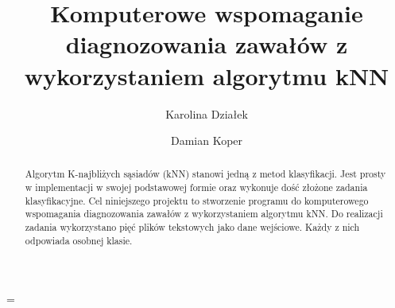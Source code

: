 \documentclass[runningheads]{llncs2e/llncs}
\begin{document}
\setlength{\tabcolsep}{5pt}
\tabulinesep=2.5pt
\LTcapwidth=\textwidth

\title{Komputerowe wspomaganie diagnozowania zawałów z wykorzystaniem algorytmu kNN}

%
%
\author{Karolina Działek \and
    Damian Koper
}
%
%
%
\maketitle              %
%
\begin{abstract}
    Algorytm K-najbliżych sąsiadów (kNN) stanowi jedną z metod klasyfikacji. Jest prosty w implementacji w swojej podstawowej formie oraz wykonuje dość złożone zadania klasyfikacyjne. Cel niniejszego projektu to stworzenie programu do komputerowego wspomagania diagnozowania zawałów z wykorzystaniem algorytmu kNN. Do realizacji zadania wykorzystano pięć plików tekstowych jako dane wejściowe. Każdy z nich odpowiada osobnej klasie.

\end{abstract}
%



\clearpage
%
%
%


%
\end{document}
